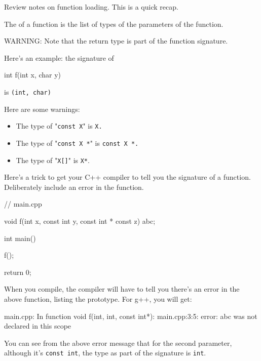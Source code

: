 



\newpage{}

Review notes on function loading. This is a quick recap.

The  of a function is the list of types of the
parameters of the function.

WARNING: Note that the return type is  part of the
function signature.

Here's an example: the signature of

\begin{consolethree}[escapeinside=||]
int f(int x, char y) {}
\end{consolethree}

is \texttt{(int, char)}

Here are some warnings:

\begin{itemize}
\item The type of "\texttt{const X}" is \texttt{X.}
\item The type of "\texttt{const X *}" is \texttt{const X *.}
\item The type of "\texttt{X[]}" is \texttt{X*}.
\end{itemize}

Here's a trick to get your C++ compiler to tell you the signature of a
function. Deliberately include an error in the function.

\begin{consolethree}[escapeinside=||]
// main.cpp

void f(int x, const int y, const int * const z)
{
    abc;
}

int main()
{
    f();

    return 0;
}
\end{consolethree}

When you compile, the compiler will have to tell you there's an error in
the above function, listing the prototype. For g++, you will get:

\begin{consolethree}[escapeinside=||]
main.cpp: In function void f(int, int, const int*):
main.cpp:3:5: error: abc was not declared in this
scope
\end{consolethree}

You can see from the above error message that for the second parameter,
although it's \texttt{const int}, the type as part of the
signature is \texttt{int}.

